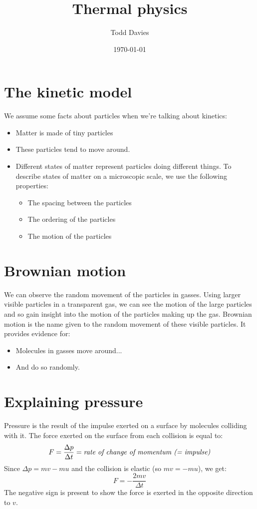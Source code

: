 \documentclass{article}
\title{Thermal physics}
\author{Todd Davies}
\date{\today}
\begin{document}
\lhead{\today}

\maketitle

\section*{The kinetic model}
\thispagestyle{empty}
We assume some facts about particles when we're talking about kinetics:
\begin{itemize}
	\item Matter is made of tiny particles
	\item These particles tend to move around.
	\item Different states of matter represent particles doing different things. To describe states of matter on a microscopic scale, we use the following properties:
		\begin{itemize}
			\item The spacing between the particles
			\item The ordering of the particles
			\item The motion of the particles
		\end{itemize}
\end{itemize}

\section*{Brownian motion}
We can observe the random movement of the particles in gasses. Using larger visible particles in a transparent gas, we can see the motion of the large particles and so gain insight into the motion of the particles making up the gas. Brownian motion is the name given to the random movement of these visible particles. It provides evidence for:
\begin{itemize}
	\item Molecules in gasses move around...
	\item And do so randomly.
\end{itemize}

\section*{Explaining pressure}
Pressure is the result of the impulse exerted on a surface by molecules colliding with it. The force exerted on the surface from each collision is equal to:
\[
	F = \frac{\Delta p}{\Delta t} = \textrm{\textit{rate of change of momentum (= impulse)}}
\]
Since $\Delta p = mv - mu$ and the collision is elastic (so $mv = -mu$), we get:
\[
	F = -\frac{2mv}{\Delta t}
\]
The negative sign is present to show the force is exerted in the opposite direction to $v$.
\end{document}
